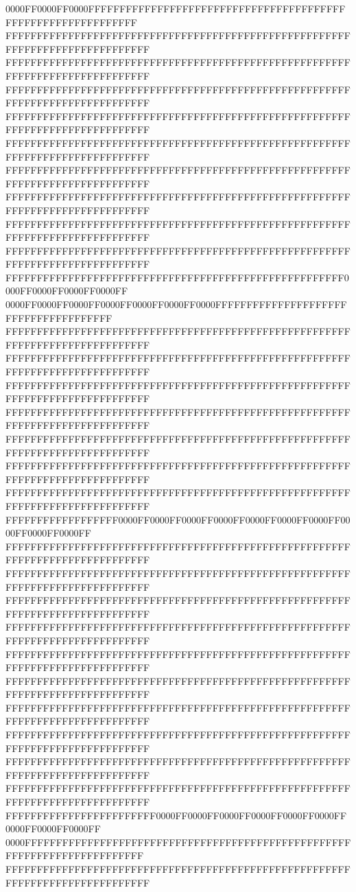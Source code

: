 0000FF0000FF0000FFFFFFFFFFFFFFFFFFFFFFFFFFFFFFFFFFFFFFFFFFFFFFFFFFFFFFFFFFFFFF
FFFFFFFFFFFFFFFFFFFFFFFFFFFFFFFFFFFFFFFFFFFFFFFFFFFFFFFFFFFFFFFFFFFFFFFFFFFFFF
FFFFFFFFFFFFFFFFFFFFFFFFFFFFFFFFFFFFFFFFFFFFFFFFFFFFFFFFFFFFFFFFFFFFFFFFFFFFFF
FFFFFFFFFFFFFFFFFFFFFFFFFFFFFFFFFFFFFFFFFFFFFFFFFFFFFFFFFFFFFFFFFFFFFFFFFFFFFF
FFFFFFFFFFFFFFFFFFFFFFFFFFFFFFFFFFFFFFFFFFFFFFFFFFFFFFFFFFFFFFFFFFFFFFFFFFFFFF
FFFFFFFFFFFFFFFFFFFFFFFFFFFFFFFFFFFFFFFFFFFFFFFFFFFFFFFFFFFFFFFFFFFFFFFFFFFFFF
FFFFFFFFFFFFFFFFFFFFFFFFFFFFFFFFFFFFFFFFFFFFFFFFFFFFFFFFFFFFFFFFFFFFFFFFFFFFFF
FFFFFFFFFFFFFFFFFFFFFFFFFFFFFFFFFFFFFFFFFFFFFFFFFFFFFFFFFFFFFFFFFFFFFFFFFFFFFF
FFFFFFFFFFFFFFFFFFFFFFFFFFFFFFFFFFFFFFFFFFFFFFFFFFFFFFFFFFFFFFFFFFFFFFFFFFFFFF
FFFFFFFFFFFFFFFFFFFFFFFFFFFFFFFFFFFFFFFFFFFFFFFFFFFFFFFFFFFFFFFFFFFFFFFFFFFFFF
FFFFFFFFFFFFFFFFFFFFFFFFFFFFFFFFFFFFFFFFFFFFFFFFFFFFFF0000FF0000FF0000FF0000FF
0000FF0000FF0000FF0000FF0000FF0000FF0000FFFFFFFFFFFFFFFFFFFFFFFFFFFFFFFFFFFFFF
FFFFFFFFFFFFFFFFFFFFFFFFFFFFFFFFFFFFFFFFFFFFFFFFFFFFFFFFFFFFFFFFFFFFFFFFFFFFFF
FFFFFFFFFFFFFFFFFFFFFFFFFFFFFFFFFFFFFFFFFFFFFFFFFFFFFFFFFFFFFFFFFFFFFFFFFFFFFF
FFFFFFFFFFFFFFFFFFFFFFFFFFFFFFFFFFFFFFFFFFFFFFFFFFFFFFFFFFFFFFFFFFFFFFFFFFFFFF
FFFFFFFFFFFFFFFFFFFFFFFFFFFFFFFFFFFFFFFFFFFFFFFFFFFFFFFFFFFFFFFFFFFFFFFFFFFFFF
FFFFFFFFFFFFFFFFFFFFFFFFFFFFFFFFFFFFFFFFFFFFFFFFFFFFFFFFFFFFFFFFFFFFFFFFFFFFFF
FFFFFFFFFFFFFFFFFFFFFFFFFFFFFFFFFFFFFFFFFFFFFFFFFFFFFFFFFFFFFFFFFFFFFFFFFFFFFF
FFFFFFFFFFFFFFFFFFFFFFFFFFFFFFFFFFFFFFFFFFFFFFFFFFFFFFFFFFFFFFFFFFFFFFFFFFFFFF
FFFFFFFFFFFFFFFFFF0000FF0000FF0000FF0000FF0000FF0000FF0000FF0000FF0000FF0000FF
FFFFFFFFFFFFFFFFFFFFFFFFFFFFFFFFFFFFFFFFFFFFFFFFFFFFFFFFFFFFFFFFFFFFFFFFFFFFFF
FFFFFFFFFFFFFFFFFFFFFFFFFFFFFFFFFFFFFFFFFFFFFFFFFFFFFFFFFFFFFFFFFFFFFFFFFFFFFF
FFFFFFFFFFFFFFFFFFFFFFFFFFFFFFFFFFFFFFFFFFFFFFFFFFFFFFFFFFFFFFFFFFFFFFFFFFFFFF
FFFFFFFFFFFFFFFFFFFFFFFFFFFFFFFFFFFFFFFFFFFFFFFFFFFFFFFFFFFFFFFFFFFFFFFFFFFFFF
FFFFFFFFFFFFFFFFFFFFFFFFFFFFFFFFFFFFFFFFFFFFFFFFFFFFFFFFFFFFFFFFFFFFFFFFFFFFFF
FFFFFFFFFFFFFFFFFFFFFFFFFFFFFFFFFFFFFFFFFFFFFFFFFFFFFFFFFFFFFFFFFFFFFFFFFFFFFF
FFFFFFFFFFFFFFFFFFFFFFFFFFFFFFFFFFFFFFFFFFFFFFFFFFFFFFFFFFFFFFFFFFFFFFFFFFFFFF
FFFFFFFFFFFFFFFFFFFFFFFFFFFFFFFFFFFFFFFFFFFFFFFFFFFFFFFFFFFFFFFFFFFFFFFFFFFFFF
FFFFFFFFFFFFFFFFFFFFFFFFFFFFFFFFFFFFFFFFFFFFFFFFFFFFFFFFFFFFFFFFFFFFFFFFFFFFFF
FFFFFFFFFFFFFFFFFFFFFFFFFFFFFFFFFFFFFFFFFFFFFFFFFFFFFFFFFFFFFFFFFFFFFFFFFFFFFF
FFFFFFFFFFFFFFFFFFFFFFFF0000FF0000FF0000FF0000FF0000FF0000FF0000FF0000FF0000FF
0000FFFFFFFFFFFFFFFFFFFFFFFFFFFFFFFFFFFFFFFFFFFFFFFFFFFFFFFFFFFFFFFFFFFFFFFFFF
FFFFFFFFFFFFFFFFFFFFFFFFFFFFFFFFFFFFFFFFFFFFFFFFFFFFFFFFFFFFFFFFFFFFFFFFFFFFFF

